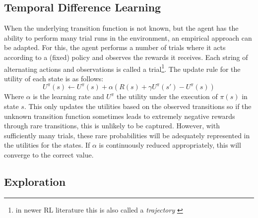 \subsection{Temporal Difference Learning}%
\label{sub:temporal_difference_learning}

When the underlying transition function is not known, but the agent has the ability to perform many trial runs in the
environment, an empirical approach can be adapted. For this, the agent performs a number of trials where it acts
according to a (fixed) policy and observes the rewards it receives. Each string of alternating actions and observations
is called a trial\footnote{in newer \ac{RL} literature this is also called a \emph{trajectory} \citep{proximalpolicyopt, heess2017emergence} }.
The update rule for the utility of each state is as follows:
\begin{equation}
    U^\pi(s) \gets U^\pi(s) + \alpha(R(s) + \gamma U^\pi(s') - U^\pi(s))
\end{equation}
Where $\alpha$ is the learning rate and $U^\pi$ the utility under the execution of $\pi(s)$ in state $s$. This only
updates the utilities based on the observed transitions so if the unknown transition function sometimes leads to
extremely negative rewards through rare transitions, this is unlikely to be captured. However, with sufficiently many
trials, these rare probabilities will be adequately represented in the utilities for the states. If $\alpha$ is
continuously reduced appropriately, this will converge to the correct value.

\subsection{Exploration}%
\label{sub:exploration}

